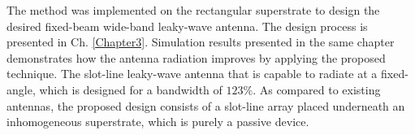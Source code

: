 
The method was implemented on the rectangular superstrate to design the desired fixed-beam wide-band leaky-wave antenna. The design process is presented in Ch. \ref{Chapter3}. Simulation results presented in the same chapter demonstrates how the antenna radiation improves by applying the proposed technique. The slot-line leaky-wave antenna that is capable to radiate at a fixed-angle, which is designed for a bandwidth of $123\%$. As compared to existing antennas, the proposed design consists of a slot-line array placed underneath an inhomogeneous superstrate, which is purely a passive device. 


